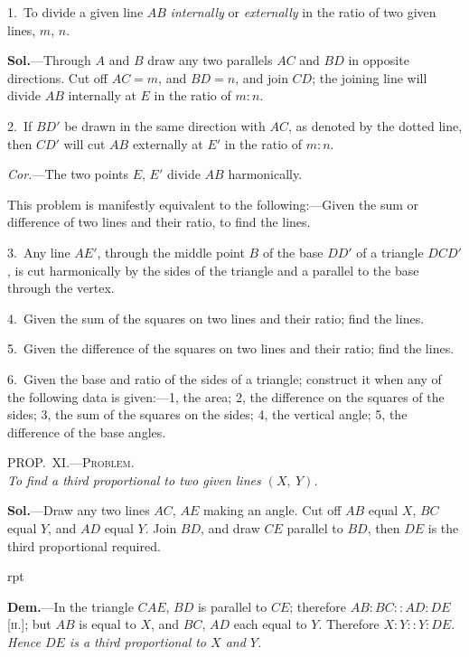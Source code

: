 \documentclass[oneside]{book}
\newcommand\myprop[2]{
\bigskip\Needspace*{4\baselineskip}\begin{center}\textsc{#1}\\\medskip\emph{#2}\par\end{center}
}
\newcommand\imgflow[3]{
\setcounter{wrapwidth}{#1}
\begin{wrapfigure}[#2]{r}{\value{wrapwidth}pt}
\begin{center}
\vspace{-0.3in}
\end{center}
\end{wrapfigure}
}
\newcommand\imgcent[2]{
\begin{center}
\end{center}
}
\begin{document}
\begin{footnotesize}
1.~To divide a given line $AB$ \emph{internally} or \emph{externally} in the
ratio of two given lines, $m$, $n$.

\imgcent{250}{f179}

\textbf{Sol.}---Through $A$ and $B$ draw any two parallels $AC$ and $BD$ in
opposite directions. Cut off $AC = m$, and $BD = n$, and join
$CD$; the joining line will divide $AB$ internally at $E$ in the ratio
of $m : n$.

2.~If $BD'$ be drawn in the same direction with $AC$, as denoted
by the dotted line, then $CD'$ will cut $AB$ externally at $E'$ in the
ratio of $m : n$.

\emph{Cor.}---The two points $E$, $E'$ divide $AB$ harmonically.

This problem is manifestly equivalent to the following:---Given
the sum or difference of two lines and their ratio, to find
the lines.

3.~Any line $AE'$, through the middle point $B$ of the base $DD'$
of a triangle $DCD'$, is cut harmonically by the sides of the
triangle and a parallel to the base through the vertex.

4.~Given the sum of the squares on two lines and their ratio;
find the lines.

5.~Given the difference of the squares on two lines and their
ratio; find the lines.

6.~Given the base and ratio of the sides of a triangle; construct
it when any of the following data is given:---1, the area;
2, the difference on the squares of the sides; 3, the sum of the
squares on the sides; 4, the vertical angle; 5, the difference of
the base angles.
\par\end{footnotesize}

\myprop{PROP\@.~XI\@.---Problem.}{To find a third proportional\index{Proportionals!third} to two given lines $(X,\ Y)$.}

\textbf{Sol.}---Draw any two lines $AC$, $AE$ making an angle.
Cut off $AB$ equal $X$, $BC$ equal $Y$, and $AD$ equal $Y$.
Join $BD$, and draw $CE$ parallel to $BD$, then $DE$ is the
third proportional required.


\imgflow{175}{7}{f180}

\textbf{Dem.}---In the triangle $CAE$, $BD$ is parallel to
$CE$; therefore $AB : BC
:: AD : DE$ [\textsc{ii.}]; but
$AB$ is equal to $X$, and
$BC$, $AD$ each equal to
$Y$. Therefore $X : Y
:: Y : DE$. \textit{Hence $DE$
is a third proportional to $X$ and $Y$.}
\end{document}

